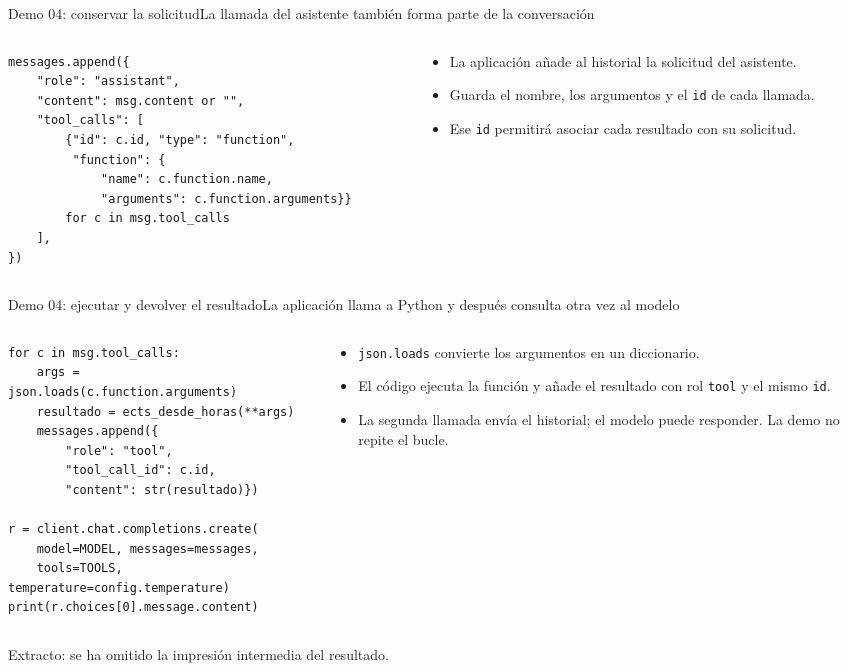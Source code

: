 \begin{frame}[fragile]{Demo 04: conservar la solicitud}{La llamada del asistente también forma parte de la conversación}
	\begin{columns}[T]
		\begin{column}{0.61\textwidth}
			\begin{lstlisting}
messages.append({
    "role": "assistant",
    "content": msg.content or "",
    "tool_calls": [
        {"id": c.id, "type": "function",
         "function": {
             "name": c.function.name,
             "arguments": c.function.arguments}}
        for c in msg.tool_calls
    ],
})
\end{lstlisting}
		\end{column}
		\begin{column}{0.37\textwidth}
			\footnotesize
			\begin{itemize}
				\item La aplicación añade al historial la solicitud del asistente.
				\item Guarda el nombre, los argumentos y el \texttt{id} de cada llamada.
				\item Ese \texttt{id} permitirá asociar cada resultado con su solicitud.
			\end{itemize}
		\end{column}
	\end{columns}
\end{frame}

\begin{frame}[fragile]{Demo 04: ejecutar y devolver el resultado}{La aplicación llama a Python y después consulta otra vez al modelo}
	\begin{columns}[T]
		\begin{column}{0.61\textwidth}
			\begin{lstlisting}
for c in msg.tool_calls:
    args = json.loads(c.function.arguments)
    resultado = ects_desde_horas(**args)
    messages.append({
        "role": "tool",
        "tool_call_id": c.id,
        "content": str(resultado)})

r = client.chat.completions.create(
    model=MODEL, messages=messages,
    tools=TOOLS, temperature=config.temperature)
print(r.choices[0].message.content)
\end{lstlisting}
		\end{column}
		\begin{column}{0.37\textwidth}
			\footnotesize
			\begin{itemize}
				\item \texttt{json.loads} convierte los argumentos en un diccionario.
				\item El código ejecuta la función y añade el resultado con rol \texttt{tool} y el mismo \texttt{id}.
				\item La segunda llamada envía el historial; el modelo puede responder. La demo no repite el bucle.
			\end{itemize}
		\end{column}
	\end{columns}
	{\scriptsize Extracto: se ha omitido la impresión intermedia del resultado.}
\end{frame}

